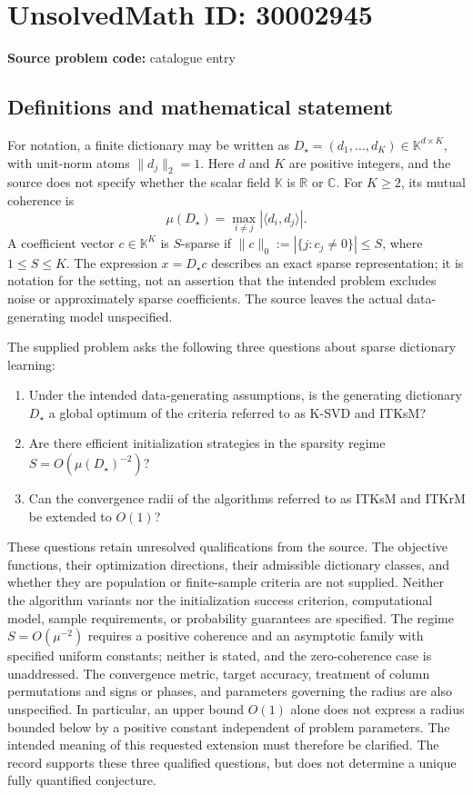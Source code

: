 \documentclass[11pt]{article}
\newcommand{\R}{\mathbb{R}}
\newcommand{\C}{\mathbb{C}}
\begin{document}
\section*{UnsolvedMath ID: 30002945}
\textbf{Source problem code:} catalogue entry
\subsection{Definitions and mathematical statement}
For notation, a finite dictionary may be written as \(D_\star=(d_1,\ldots,d_K)\in\mathbb{K}^{d\times K}\), with unit-norm atoms \(\|d_j\|_2=1\). Here \(d\) and \(K\) are positive integers, and the source does not specify whether the scalar field \(\mathbb{K}\) is \(\R\) or \(\C\). For \(K\geq2\), its mutual coherence is
\[
\mu(D_\star)=\max_{i\ne j}|\langle d_i,d_j\rangle|.
\]
A coefficient vector \(c\in\mathbb{K}^K\) is \(S\)-sparse if \(\|c\|_0:=|\{j:c_j\ne0\}|\leq S\), where \(1\leq S\leq K\). The expression \(x=D_\star c\) describes an exact sparse representation; it is notation for the setting, not an assertion that the intended problem excludes noise or approximately sparse coefficients. The source leaves the actual data-generating model unspecified.

The supplied problem asks the following three questions about sparse dictionary learning:
\begin{enumerate}
\item Under the intended data-generating assumptions, is the generating dictionary \(D_\star\) a global optimum of the criteria referred to as K-SVD and ITKsM?
\item Are there efficient initialization strategies in the sparsity regime \(S=O(\mu(D_\star)^{-2})\)?
\item Can the convergence radii of the algorithms referred to as ITKsM and ITKrM be extended to \(O(1)\)?
\end{enumerate}
These questions retain unresolved qualifications from the source. The objective functions, their optimization directions, their admissible dictionary classes, and whether they are population or finite-sample criteria are not supplied. Neither the algorithm variants nor the initialization success criterion, computational model, sample requirements, or probability guarantees are specified. The regime \(S=O(\mu^{-2})\) requires a positive coherence and an asymptotic family with specified uniform constants; neither is stated, and the zero-coherence case is unaddressed. The convergence metric, target accuracy, treatment of column permutations and signs or phases, and parameters governing the radius are also unspecified. In particular, an upper bound \(O(1)\) alone does not express a radius bounded below by a positive constant independent of problem parameters. The intended meaning of this requested extension must therefore be clarified. The record supports these three qualified questions, but does not determine a unique fully quantified conjecture.
\end{document}
